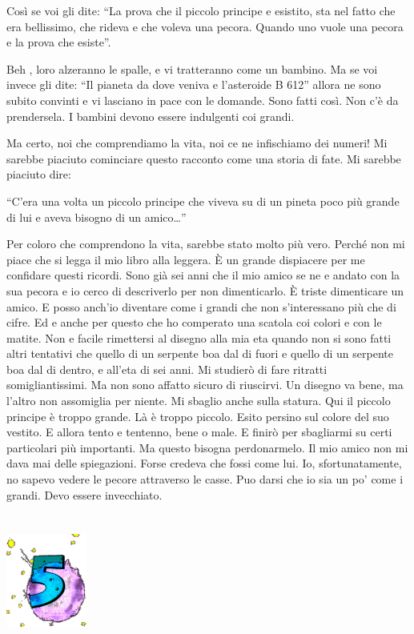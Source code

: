 \documentclass[11pt]{scrbook}
\begin{document}
Così se voi gli dite: ``La prova che il piccolo principe e esistito, sta
nel fatto che era bellissimo, che rideva e che voleva una pecora. Quando
uno vuole una pecora e la prova che esiste''.

Beh , loro alzeranno le spalle, e vi tratteranno come un bambino. Ma se
voi invece gli dite: ``Il pianeta da dove veniva e l'asteroide B 612''
allora ne sono subito convinti e vi lasciano in pace con le domande.
Sono fatti così. Non c'è da prendersela. I bambini devono essere
indulgenti coi grandi.

Ma certo, noi che comprendiamo la vita, noi ce ne infischiamo dei
numeri! Mi sarebbe piaciuto cominciare questo racconto come una storia
di fate. Mi sarebbe piaciuto dire:

``C'era una volta un piccolo principe che viveva su di un pineta poco
più grande di lui e aveva bisogno di un amico\ldots{}''

Per coloro che comprendono la vita, sarebbe stato molto più vero. Perché
non mi piace che si legga il mio libro alla leggera. È un grande
dispiacere per me confidare questi ricordi. Sono già sei anni che il mio
amico se ne e andato con la sua pecora e io cerco di descriverlo per non
dimenticarlo. È triste dimenticare un amico. E posso anch'io diventare
come i grandi che non s'interessano più che di cifre. Ed e anche per
questo che ho comperato una scatola coi colori e con le matite. Non e
facile rimettersi al disegno alla mia eta quando non si sono fatti altri
tentativi che quello di un serpente boa dal di fuori e quello di un
serpente boa dal di dentro, e all'eta di sei anni. Mi studierò di fare
ritratti somigliantissimi. Ma non sono affatto sicuro di riuscirvi. Un
disegno va bene, ma l'altro non assomiglia per niente. Mi sbaglio anche
sulla statura. Qui il piccolo principe è troppo grande. Là è troppo
piccolo. Esito persino sul colore del suo vestito. E allora tento e
tentenno, bene o male. E finirò per sbagliarmi su certi particolari più
importanti. Ma questo bisogna perdonarmelo. Il mio amico non mi dava mai
delle spiegazioni. Forse credeva che fossi come lui. Io,
sfortunatamente, no sapevo vedere le pecore attraverso le casse. Puo
darsi che io sia un po' come i grandi. Devo essere invecchiato.

\chapter{}
\begin{center}
\includegraphics{./img/chapter5.png}
\end{center}
\end{document}

